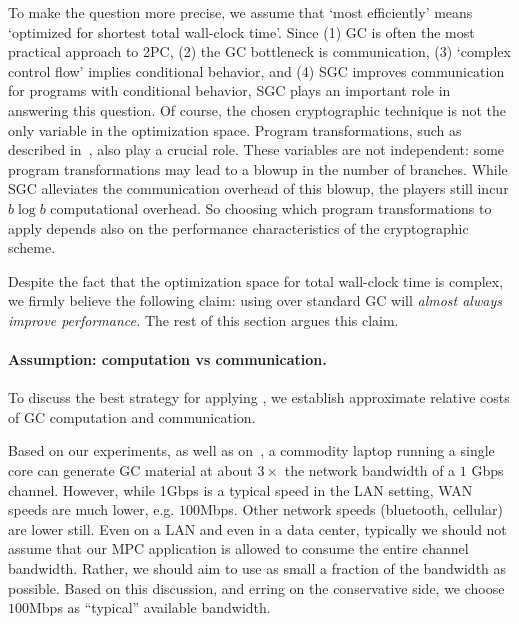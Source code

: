 To make the question more precise, we assume that `most efficiently' means
`optimized for shortest total wall-clock time'.
Since
(1) GC is often the most practical approach to 2PC,
(2) the GC bottleneck is communication,
(3) `complex control flow' implies conditional behavior, and
(4) SGC improves communication for programs with conditional behavior,
SGC plays an important role in answering this question.
%
Of course, the chosen cryptographic technique is not the only variable
in the optimization space.
Program transformations, such as described
in~, also play a crucial role.
%
These variables are not independent:
some program transformations may lead to a blowup in the number of
branches.
While SGC alleviates the communication overhead of this blowup, the
players still incur $b \log b$ computational overhead.
%
So choosing which program transformations to apply depends also on the
performance characteristics of the cryptographic scheme.

Despite the fact that the optimization space for total wall-clock time
is complex, we firmly believe the following claim:
using \ourschemelong over standard GC will \emph{almost always improve
  performance.}
The rest of this section argues this claim.

\paragraph{Assumption: computation vs communication.} 
To discuss the best strategy for applying \ourschemelong, we establish
approximate relative costs of GC computation and communication. 

 Based
on our experiments, as well as on~\cite{XiaoPersonalComm}, a commodity
laptop running a single core can generate GC material at about $3\times$ the
network bandwidth of a $1$ Gbps channel.  
However, while 1Gbps is a typical speed in the LAN setting, WAN
speeds are much lower, e.g. $100$Mbps.  Other network speeds
(bluetooth, cellular) are lower still.
Even on a LAN and even in a data center, typically we should
not assume that our MPC application is allowed to consume the entire
channel bandwidth. Rather, we should aim to use as small a fraction of
the bandwidth as possible.  Based on this discussion, and erring on
the conservative side,  we choose $100$Mbps as
``typical'' available bandwidth.
%


